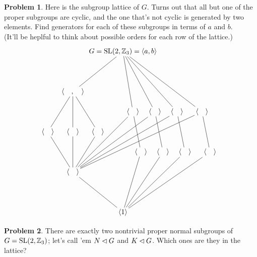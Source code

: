 \documentclass[12pt]{article}
\theoremstyle{definition} %
\newtheorem{problem}{Problem}
\begin{document}
\begin{problem}
  Here is the subgroup lattice of $G$. Turns out that all but one of the proper subgroups are cyclic, and the one that's not cyclic is generated by two elements. Find generators for each of these subgroups in terms of $a$ and $b$. \\(It'll be heplful to think about possible orders for each row of the lattice.)
  \[
    \hspace*{-2mm}
    \begin{tikzpicture}[node distance=1cm,shorten >= -2pt, shorten <= -2pt,scale=1]
      \begin{scope}[shift={(0,0)}]
        \node (1) {$\<1\>$};
        \node (a3) at (-2.5,2) {$\<\quad\>$};
        \node (a2) at (.9,3) {$\<\quad\>$};
        \node (b2) at (2,3) {$\<\quad\>$};
        \node (abab) at (3.1,3) {$\<\quad\>$};
        \node (baba) at (4.35,3) {$\<\quad\>$};
        \node (a2b) at (-3.75,4) {$\<\quad\>$};
        \node (aba) at (-2.5,4) {$\<\quad\>$};
        \node (ab2) at (-1.25,4) {$\<\quad\>$};
        \node (a) at (.5,5) {$\<\quad\>$};
        \node (b) at (1.6,5) {$\<\quad\>$};
        \node (ab) at (2.7,5) {$\<\quad\>$};
        \node (ba) at (3.95,5) {$\<\quad\>$};
        \node (a2b-ab2) at (-2.5,6) {$\<\quad, \quad\>$};
        \node (G) at (0,8) {$G = \SL(2,\Z_3) = \<a,b\>$};
        \draw (1) -- (a3);
        \draw (1) -- (a2);
        \draw (1) -- (b2);
        \draw (1) -- (abab);
        \draw (1) -- (baba);
        \draw (a3) -- (a2b);
        \draw (a3) -- (aba);
        \draw (a3) -- (ab2);
        \draw (a3) -- (a);
        \draw (a3) -- (b);
        \draw (a3) -- (ab);
        \draw (a3) -- (ba);
        \draw (a2) -- (a);
        \draw (b2) -- (b);
        \draw (abab) -- (ab);
        \draw (baba) -- (ba);
        \draw (a2b) -- (a2b-ab2);
        \draw (aba) -- (a2b-ab2);
        \draw (ab2) -- (a2b-ab2);
        \draw (G) -- (a2b-ab2);
        \draw (G) -- (a);
        \draw (G) -- (b);
        \draw (G) -- (ab);
        \draw (G) -- (ba);
      \end{scope}
    \end{tikzpicture}
    \]
\end{problem}

\begin{problem}
  There are exactly two nontrivial proper normal subgroups of $G = \operatorname{SL}(2, \mathbb{Z}_3)$; let's call 'em $N\lhd G$ and $K\lhd G$. Which ones are they in the lattice?
\end{problem}
\end{document}
